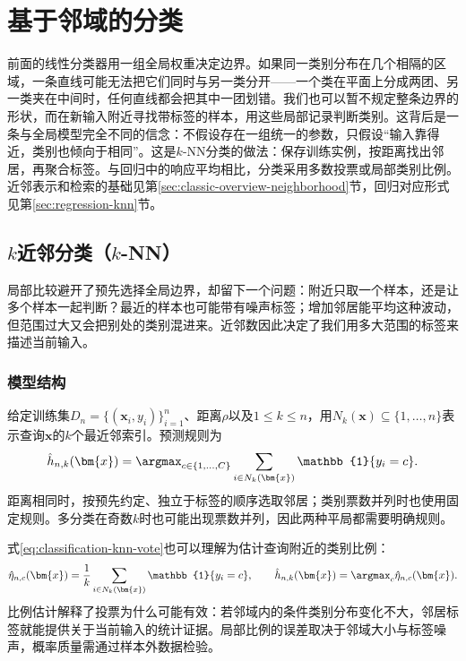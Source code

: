 \section{基于邻域的分类}
\label{sec:classification-instances}

前面的线性分类器用一组全局权重决定边界。如果同一类别分布在几个相隔的区域，一条直线可能无法把它们同时与另一类分开——一个类在平面上分成两团、另一类夹在中间时，任何直线都会把其中一团划错。我们也可以暂不规定整条边界的形状，而在新输入附近寻找带标签的样本，用这些局部记录判断类别。这背后是一条与全局模型完全不同的信念：不假设存在一组统一的参数，只假设“输入靠得近，类别也倾向于相同”。这是$k$-NN分类的做法：保存训练实例，按距离找出邻居，再聚合标签。与回归中的响应平均相比，分类采用多数投票或局部类别比例。近邻表示和检索的基础见第\ref{sec:classic-overview-neighborhood}节，回归对应形式见第\ref{sec:regression-knn}节。

\subsection{$k$近邻分类（$k$-NN）}
\label{sec:classification-knn}

局部比较避开了预先选择全局边界，却留下一个问题：附近只取一个样本，还是让多个样本一起判断？最近的样本也可能带有噪声标签；增加邻居能平均这种波动，但范围过大又会把别处的类别混进来。近邻数因此决定了我们用多大范围的标签来描述当前输入。

\subsubsection{模型结构}
\label{sec:classification-knn-structure}

给定训练集$D_n=\{(\bm{x}_i,y_i)\}_{i=1}^n$、距离$\rho$以及$1\leq k\leq n$，用$N_k(\bm{x})\subseteq\{1,\ldots,n\}$表示查询$\bm{x}$的$k$个最近邻索引。预测规则为
\begin{equation}
  \hat h_{n,k}(\bm{x})
  =\argmax_{c\in\{1,\ldots,C\}}
  \sum_{i\in N_k(\bm{x})}\mathbb{1}\{y_i=c\}.
  \label{eq:classification-knn-vote}
\end{equation}
距离相同时，按预先约定、独立于标签的顺序选取邻居；类别票数并列时也使用固定规则。多分类在奇数$k$时也可能出现票数并列，因此两种平局都需要明确规则。

式\eqref{eq:classification-knn-vote}也可以理解为估计查询附近的类别比例：
\begin{equation}
  \hat\eta_{n,c}(\bm{x})
  =\frac{1}{k}\sum_{i\in N_k(\bm{x})}\mathbb{1}\{y_i=c\},
  \qquad
  \hat h_{n,k}(\bm{x})=\argmax_c\hat\eta_{n,c}(\bm{x}).
  \label{eq:classification-knn-posterior}
\end{equation}
比例估计解释了投票为什么可能有效：若邻域内的条件类别分布变化不大，邻居标签就能提供关于当前输入的统计证据。局部比例的误差取决于邻域大小与标签噪声，概率质量需通过样本外数据检验。

